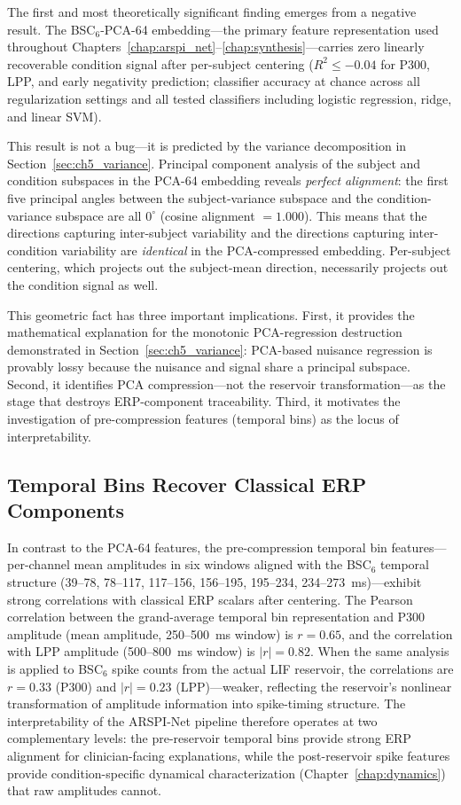 The first and most theoretically significant finding emerges from a negative result. The BSC$_6$-PCA-64 embedding---the primary feature representation used throughout Chapters~\ref{chap:arspi_net}--\ref{chap:synthesis}---carries zero linearly recoverable condition signal after per-subject centering ($R^2 \leq -0.04$ for P300, LPP, and early negativity prediction; classifier accuracy at chance across all regularization settings and all tested classifiers including logistic regression, ridge, and linear SVM).

This result is not a bug---it is predicted by the variance decomposition in Section~\ref{sec:ch5_variance}. Principal component analysis of the subject and condition subspaces in the PCA-64 embedding reveals \emph{perfect alignment}: the first five principal angles between the subject-variance subspace and the condition-variance subspace are all $0^\circ$ (cosine alignment $= 1.000$). This means that the directions capturing inter-subject variability and the directions capturing inter-condition variability are \emph{identical} in the PCA-compressed embedding. Per-subject centering, which projects out the subject-mean direction, necessarily projects out the condition signal as well.

This geometric fact has three important implications. First, it provides the mathematical explanation for the monotonic PCA-regression destruction demonstrated in Section~\ref{sec:ch5_variance}: PCA-based nuisance regression is provably lossy because the nuisance and signal share a principal subspace. Second, it identifies PCA compression---not the reservoir transformation---as the stage that destroys ERP-component traceability. Third, it motivates the investigation of pre-compression features (temporal bins) as the locus of interpretability.

\subsection{Temporal Bins Recover Classical ERP Components}
\label{sec:erp_recovery}

In contrast to the PCA-64 features, the pre-compression temporal bin features---per-channel mean amplitudes in six windows aligned with the BSC$_6$ temporal structure (39--78, 78--117, 117--156, 156--195, 195--234, 234--273~ms)---exhibit strong correlations with classical ERP scalars after centering. The Pearson correlation between the grand-average temporal bin representation and P300 amplitude (mean amplitude, 250--500~ms window) is $r = 0.65$, and the correlation with LPP amplitude (500--800~ms window) is $|r| = 0.82$. When the same analysis is applied to BSC$_6$ spike counts from the actual LIF reservoir, the correlations are $r = 0.33$ (P300) and $|r| = 0.23$ (LPP)---weaker, reflecting the reservoir's nonlinear transformation of amplitude information into spike-timing structure. The interpretability of the ARSPI-Net pipeline therefore operates at two complementary levels: the pre-reservoir temporal bins provide strong ERP alignment for clinician-facing explanations, while the post-reservoir spike features provide condition-specific dynamical characterization (Chapter~\ref{chap:dynamics}) that raw amplitudes cannot.

